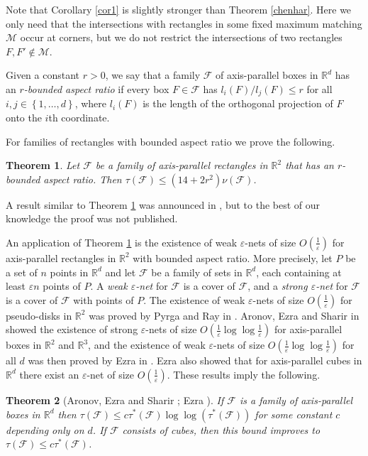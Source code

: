 \documentclass[12pt]{amsart}
\theoremstyle{plain}
\newtheorem{theorem}{Theorem}[section]
\theoremstyle{definition}
\theoremstyle{remark}
\newcommand{\F}{\mathcal{F}}
\newcommand{\M}{\mathcal{M}}
\newcommand{\R}{\mathbb{R}}
\newcommand{\e}{\varepsilon}
\newcommand{\sset}[1]{\left\{#1\right\}}
\begin{document}
Note that Corollary \ref{cor1} is slightly stronger than Theorem \ref{chenhar}. Here we only need that the intersections with rectangles in some fixed maximum matching $\M$ occur at corners, but we do not restrict the intersections of two rectangles $F,F' \notin \M$.  

Given a constant $r>0$, we say that a family $\F$ of axis-parallel boxes in $\R^d$ has an \emph{$r$-bounded aspect ratio} if every box $F\in \F$ has $l_i(F)/l_j(F) \le r$ for all $i, j \in \sset{1,\dots, d}$, where $l_i(F)$ is the length of the orthogonal projection of $F$ onto the $i$th coordinate. 
 
For families of rectangles with bounded aspect ratio we prove the following. 

\begin{theorem}\label{mainthm2}
Let $\F$ be a family of axis-parallel rectangles in $\R^2$ that has an $r$-bounded aspect ratio. Then $\tau(\F) \leq (14+2r^2)\nu(\F)$.
\end{theorem}

A result similar to Theorem \ref{mainthm2} was announced in \cite{ahlkar}, but to the best of our knowledge the proof was not published. 

An application of Theorem \ref{mainthm2} is 
the existence of weak $\e$-nets of size $O \left(\frac{1}{\e} \right)$ for axis-parallel rectangles in $\R^2$ with bounded aspect ratio. More precisely, let $P$ be a set of $n$ points in $\R^d$ and let $\F$ be a family of sets in $\R^d$, each containing at least $\e n$ points of $P$.  
A \emph{weak $\e$-net} for $\F$ is a cover of $\F$, and a \emph{strong $\e$-net} for $\F$ is a cover of $\F$ with points of $P$. The existence of weak $\e$-nets of size $O \left(\frac{1}{\e} \right)$ for pseudo-disks in $\R^2$ was proved by Pyrga and Ray in \cite{pygra}. Aronov, Ezra and Sharir in \cite{aronovezrasharir} showed the existence of strong $\e$-nets of size $O \left( \frac{1}{\e} \log \log \frac{1}{\e} \right)$ for axis-parallel boxes in $\R^2$ and $\R^3$, and the existence of weak $\e$-nets of size $O \left( \frac{1}{\e} \log \log \frac{1}{\e} \right)$ for all $d$ was then proved by Ezra in \cite{ezra}. Ezra also showed that for axis-parallel cubes in $\R^d$ there exist an $\e$-net of size $O \left(\frac{1}{\e} \right)$. These results imply the following.

\begin{theorem}[Aronov, Ezra and Sharir \cite{aronovezrasharir}; Ezra \cite{ezra}]\label{nets}
If $\F$ is a family of axis-parallel boxes in $\R^d$ then $\tau(\F) \leq  c\tau^*(\F)\log\log(\tau^*(\F))$ for some constant $c$ depending only on $d$. If $\F$ consists of cubes, then this bound improves to $\tau(\F) \leq  c\tau^*(\F)$. 
\end{theorem}
\end{document}
